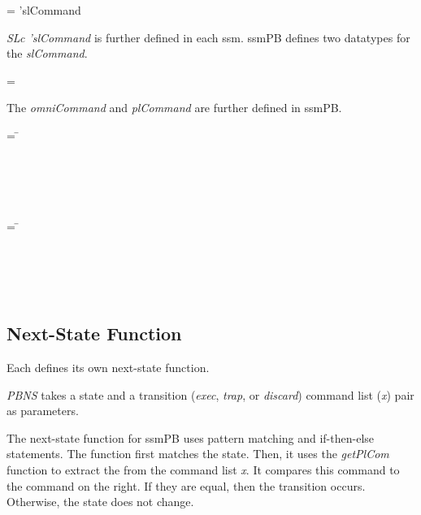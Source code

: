 \documentclass[../../main/main.tex]{subfiles}
\begin{document}
 =   \HOLTokenBar{}  'slCommand

\textit{SLc 'slCommand} is further defined in each \gls{ssm}.  ssmPB defines two datatypes for the \textit{slCommand}.

 =   \HOLTokenBar{}  

The \textit{omniCommand} and \textit{plCommand} are further defined in ssmPB.

\begin{tabbing}
 = \= \\
						\>\HOLTokenBar{} \\
            					\>\HOLTokenBar{}  \\
						\>\HOLTokenBar{} \\
            					\>\HOLTokenBar{}  \\
						\>\HOLTokenBar{} 
\end{tabbing}

\begin{tabbing}
 = \= \\
						\>\HOLTokenBar{}  \\
						\>\HOLTokenBar{}  \\
						\>\HOLTokenBar{} \\
          					\>\HOLTokenBar{}  \\
						\>\HOLTokenBar{} 
\end{tabbing}

\subsection{Next-State Function}
Each  defines its own next-state function.  

\HOLssmPBIntegratedTheoremsPBNSXXdef

\textit{PBNS} takes a state and a transition (\textit{exec}, \textit{trap}, or \textit{discard}) command list (\textit{x}) pair as parameters.

The next-state function for ssmPB uses pattern matching and if-then-else statements.  The function first matches the state.  Then, it uses the \textit{getPlCom} function to extract the  from the command list \textit{x}. It compares this command to the command on the right.  If they are equal, then the transition occurs.  Otherwise, the state does not change.  
\end{document}
